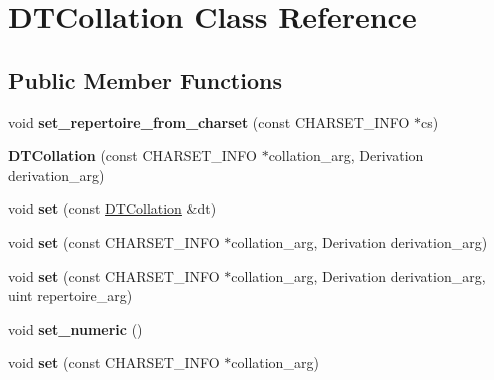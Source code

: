 \hypertarget{classDTCollation}{}\section{D\+T\+Collation Class Reference}
\label{classDTCollation}
\subsection*{Public Member Functions}
\begin{DoxyCompactItemize}
\item 
\mbox{\label{classDTCollation_a22150744e43d937401824c6852c0c13a}} 
void {\bfseries set\+\_\+repertoire\+\_\+from\+\_\+charset} (const C\+H\+A\+R\+S\+E\+T\+\_\+\+I\+N\+FO $\ast$cs)
\item 
\mbox{\label{classDTCollation_a1be3344668908b24a2db52085456053d}} 
{\bfseries D\+T\+Collation} (const C\+H\+A\+R\+S\+E\+T\+\_\+\+I\+N\+FO $\ast$collation\+\_\+arg, Derivation derivation\+\_\+arg)
\item 
\mbox{\label{classDTCollation_a2bd4d555045826eca07fc7197ebf5418}} 
void {\bfseries set} (const \mbox{\hyperlink{classDTCollation}{D\+T\+Collation}} \&dt)
\item 
\mbox{\label{classDTCollation_ac9f10d78c6cbf475e8765e2f9ddcfc1c}} 
void {\bfseries set} (const C\+H\+A\+R\+S\+E\+T\+\_\+\+I\+N\+FO $\ast$collation\+\_\+arg, Derivation derivation\+\_\+arg)
\item 
\mbox{\label{classDTCollation_a66c4d6b71798f888953586fb782bb790}} 
void {\bfseries set} (const C\+H\+A\+R\+S\+E\+T\+\_\+\+I\+N\+FO $\ast$collation\+\_\+arg, Derivation derivation\+\_\+arg, uint repertoire\+\_\+arg)
\item 
\mbox{\label{classDTCollation_a689e062862bf5da9df06c888decd995c}} 
void {\bfseries set\+\_\+numeric} ()
\item 
\mbox{\label{classDTCollation_af45cc985b128e5aa51c785b94bab1e00}} 
void {\bfseries set} (const C\+H\+A\+R\+S\+E\+T\+\_\+\+I\+N\+FO $\ast$collation\+\_\+arg)
\item 
\mbox{\label{classDTCollation_a19f505fb7f9c7df300c733eccbaff5ec}} 

\end{DoxyCompactItemize}
